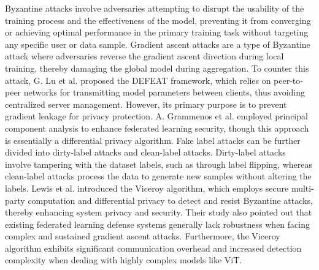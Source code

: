 \documentclass[conference]{IEEEtran}
\begin{document}
Byzantine attacks involve adversaries attempting to disrupt the usability of the training process and the effectiveness of the model, preventing it from converging or achieving optimal performance in the primary training task without targeting any specific user or data sample. Gradient ascent attacks are a type of Byzantine attack where adversaries reverse the gradient ascent direction during local training, thereby damaging the global model during aggregation\cite{gradientAscentAttack}. To counter this attack, G. Lu et al. proposed the DEFEAT framework\cite{gradientAscentAttack_privacy}, which relies on peer-to-peer networks for transmitting model parameters between clients, thus avoiding centralized server management. However, its primary purpose is to prevent gradient leakage for privacy protection. A. Grammenos et al. employed principal component analysis to enhance federated learning security\cite{federatedPCA}, though this approach is essentially a differential privacy algorithm. Fake label attacks can be further divided into dirty-label attacks\cite{latentAttack} and clean-label attacks\cite{cleanLabelAttack}. Dirty-label attacks involve tampering with the dataset labels, such as through label flipping\cite{tailAttack_SuchAsLabelFlip}, whereas clean-label attacks process the data to generate new samples without altering the labels. Lewis et al. introduced the Viceroy algorithm\cite{gradientAscentAttackAndLabelFlip}, which employs secure multi-party computation and differential privacy to detect and resist Byzantine attacks, thereby enhancing system privacy and security. Their study also pointed out that existing federated learning defense systems generally lack robustness when facing complex and sustained gradient ascent attacks. Furthermore, the Viceroy algorithm exhibits significant communication overhead and increased detection complexity when dealing with highly complex models like ViT.

\end{document}
